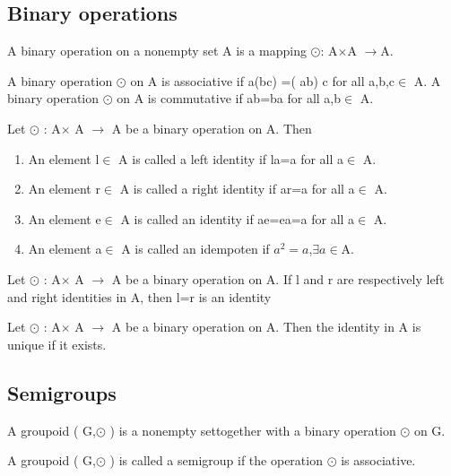\documentclass[cn,10pt,math=newtx,citestyle=gb7714-2015,bibstyle=gb7714-2015]{elegantbook}
\begin{document}
\subsection{Binary operations}
\begin{definition}
    A binary operation on a nonempty set A is a mapping 
$\odot$: A$\times$A $\to$A.

A binary operation $\odot$  on A is associative if a(bc) =( ab) c for all a,b,c$\in$ A.
A binary operation $\odot$  on A is commutative if ab=ba for all a,b$\in$ A.

\end{definition}

\begin{definition}
    Let $\odot$ : A$\times$ A $\rightarrow$  A be a binary operation on A. Then
\begin{enumerate}
\item An element l$\in$ A is called a left identity if la=a for all a$\in$ A. 
\item An element r$\in$ A is called a right identity if ar=a for all a$\in$ A.
\item An element e$\in$ A is called an identity if ae=ea=a for all a$\in$ A.
\item An element a$\in$ A is called an idempoten if $a^2=a$,$\exists a\in$A.
\end{enumerate}
\end{definition}

\begin{theorem}
    Let $\odot$ : A$\times$ A $\rightarrow$ A be a binary operation on A. If l and r are respectively left and right identities in A, then l=r is an identity
\end{theorem}


\begin{theorem}
    Let $\odot$ : A$\times$ A $\rightarrow$ A be a binary operation on A. Then the identity in A is unique if it exists.
\end{theorem}

\subsection{Semigroups}
\begin{definition}[Groupoid(群胚)]
A groupoid ( G,$\odot$ )  is a nonempty settogether with a binary operation $\odot$  on G.
\end{definition}

\begin{definition}[Semigroups(半群)]
    A groupoid ( G,$\odot$ ) is called a semigroup if the operation $\odot$  is associative.
\end{definition}
\end{document}
